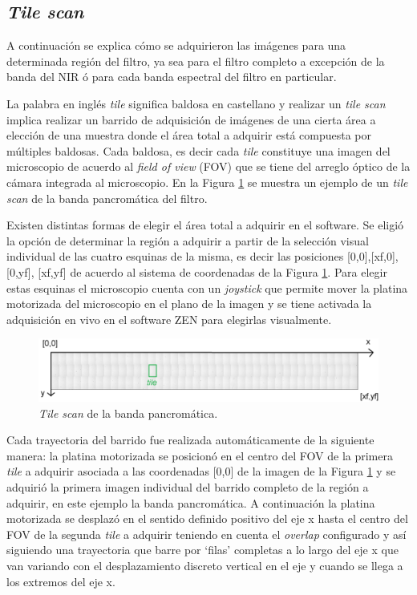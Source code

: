 \singlespacing
\subsection{\textit{Tile scan}}

\hspace{0.5cm}A continuación se explica cómo se adquirieron las imágenes para una determinada región del filtro, ya sea para el filtro completo a excepción de la banda del NIR ó para cada banda espectral del filtro en particular.

La palabra en inglés \textit{tile} significa baldosa en castellano y realizar un \textit{tile scan} implica realizar un barrido de adquisición de imágenes de una cierta área a elección de una muestra donde el área total a adquirir está compuesta por múltiples baldosas. Cada baldosa, es decir cada \textit{tile} constituye una imagen del microscopio de acuerdo al \textit{field of view} (FOV) que se tiene del arreglo óptico de la cámara integrada al microscopio. En la Figura \ref{fig:tilescan} se muestra un ejemplo de un \textit{tile scan} de la banda pancromática del filtro.

Existen distintas formas de elegir el área total a adquirir en el software. Se eligió la opción de determinar la región a adquirir a partir de la selección visual individual de las cuatro esquinas de la misma, es decir las posiciones [0,0],[xf,0],[0,yf], [xf,yf] de acuerdo al sistema de coordenadas de la Figura \ref{fig:tilescan}. Para elegir estas esquinas el microscopio cuenta con un \textit{joystick} que permite mover la platina motorizada del microscopio en el plano de la imagen y se tiene activada la adquisición en vivo en el software ZEN para elegirlas visualmente.


\begin{figure}[H]
	\centering
	\includegraphics[width=1.0\textwidth]{Figs/cuantificaciondefectos/tilescan.png}
	\caption{\textit{Tile scan} de la banda pancromática.}
	\label{fig:tilescan}
\end{figure} 

Cada trayectoria del barrido fue realizada automáticamente de la siguiente manera: la platina motorizada se posicionó en el centro del FOV de la primera \textit{tile} a adquirir asociada a las coordenadas [0,0] de la imagen de la Figura \ref{fig:tilescan} y se adquirió la primera imagen individual del barrido completo de la región a adquirir, en este ejemplo la banda pancromática. A continuación la platina motorizada se desplazó en el sentido definido positivo del eje x hasta el centro del FOV de la segunda \textit{tile} a adquirir teniendo en cuenta el \textit{overlap} configurado y así siguiendo una trayectoria que barre por `filas' completas a lo largo del eje x que van variando con el desplazamiento discreto vertical en el eje y cuando se llega a los extremos del eje x.

